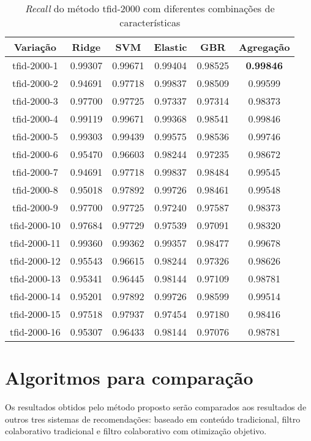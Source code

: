 \begin{table}[H]
\label{tab:recalltfid2000}
\centering
\begin{tabular}{|c| c c  c  c  c| }
\hline
Variação &  Ridge & SVM & Elastic & GBR & Agregação  \\ 
\hline
tfid-2000-1 & 0.99307 & 0.99671 & 0.99404 & 0.98525 & \textbf{0.99846} \\
\hline
tfid-2000-2 & 0.94691 & 0.97718 & 0.99837 & 0.98509 & 0.99599 \\
\hline
tfid-2000-3 & 0.97700 & 0.97725 & 0.97337 & 0.97314 & 0.98373 \\
\hline
tfid-2000-4 & 0.99119 & 0.99671 & 0.99368 & 0.98541 & 0.99846 \\
\hline
tfid-2000-5 & 0.99303 & 0.99439 & 0.99575 & 0.98536 & 0.99746 \\
\hline
tfid-2000-6 & 0.95470 & 0.96603 & 0.98244 & 0.97235 & 0.98672 \\
\hline
tfid-2000-7 & 0.94691 & 0.97718 & 0.99837 & 0.98484 & 0.99545 \\
\hline
tfid-2000-8 & 0.95018 & 0.97892 & 0.99726 & 0.98461 & 0.99548 \\
\hline
tfid-2000-9 & 0.97700 & 0.97725 & 0.97240 & 0.97587 & 0.98373 \\
\hline
tfid-2000-10 & 0.97684 & 0.97729 & 0.97539 & 0.97091 & 0.98320 \\
\hline
tfid-2000-11 & 0.99360 & 0.99362 & 0.99357 & 0.98477 & 0.99678 \\
\hline
tfid-2000-12 & 0.95543 & 0.96615 & 0.98244 & 0.97326 & 0.98626 \\
\hline
tfid-2000-13 & 0.95341 & 0.96445 & 0.98144 & 0.97109 & 0.98781 \\
\hline
tfid-2000-14 & 0.95201 & 0.97892 & 0.99726 & 0.98599 & 0.99514 \\
\hline
tfid-2000-15 & 0.97518 & 0.97937 & 0.97454 & 0.97180 & 0.98416 \\
\hline
tfid-2000-16 & 0.95307 & 0.96433 & 0.98144 & 0.97076 & 0.98781 \\
\hline
\end{tabular}
\caption{\textit{Recall} do método tfid-2000 com diferentes combinações de características}
\end{table}
\section{Algoritmos para comparação}
Os resultados obtidos pelo método proposto serão comparados aos resultados de outros tres sistemas de recomendações: baseado em conteúdo tradicional, filtro colaborativo tradicional e filtro colaborativo com otimização objetivo. 

